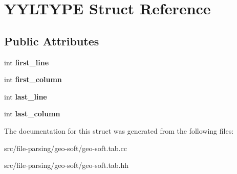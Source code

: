 \hypertarget{structYYLTYPE}{}\section{Y\+Y\+L\+T\+Y\+PE Struct Reference}
\label{structYYLTYPE}
\subsection*{Public Attributes}
\begin{DoxyCompactItemize}
\item 
\mbox{\label{structYYLTYPE_a50ad3435eaea74bcab6f1ae5fbaefd89}} 
int {\bfseries first\+\_\+line}
\item 
\mbox{\label{structYYLTYPE_a3a556533babab1b9066fa9bdbb809210}} 
int {\bfseries first\+\_\+column}
\item 
\mbox{\label{structYYLTYPE_a3075f2bc3448df5d2a9f16d22bff2cc1}} 
int {\bfseries last\+\_\+line}
\item 
\mbox{\label{structYYLTYPE_acf87f8c98686f286eaf700c4b62157b2}} 
int {\bfseries last\+\_\+column}
\end{DoxyCompactItemize}


The documentation for this struct was generated from the following files\+:\begin{DoxyCompactItemize}
\item 
src/file-\/parsing/geo-\/soft/geo-\/soft.\+tab.\+cc\item 
src/file-\/parsing/geo-\/soft/geo-\/soft.\+tab.\+hh\end{DoxyCompactItemize}
